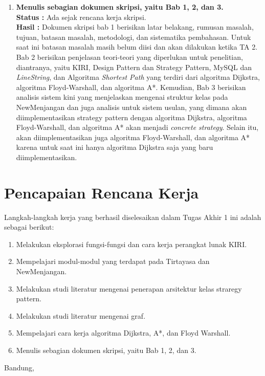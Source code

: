 \documentclass[a4paper,twoside]{article}
\begin{document}
\begin{enumerate}
		\item \textbf{Menulis sebagian dokumen skripsi, yaitu Bab 1, 2, dan 3.} \\
		{\bf Status :} Ada sejak rencana kerja skripsi.\\
		{\bf Hasil :} Dokumen skripsi bab 1 berisikan latar belakang, rumusan masalah, tujuan, batasan masalah, metodologi, dan sistematika pembahasan. Untuk saat ini batasan masalah masih belum diisi dan akan dilakukan ketika TA 2. Bab 2 berisikan penjelasan teori-teori yang diperlukan untuk penelitian, diantranya, yaitu KIRI, Design Pattern dan Strategy Pattern, MySQL dan \textit{LineString}, dan Algoritma \textit{Shortest Path} yang terdiri dari algoritma Dijkstra, algoritma Floyd-Warshall, dan algoritma A*. Kemudian, Bab 3 berisikan analisis sistem kini yang menjelaskan mengenai struktur kelas pada NewMenjangan dan juga analisis untuk sistem usulan, yang dimana akan diimplementasikan strategy pattern dengan algoritma Dijkstra, algoritma Floyd-Warshall, dan algoritma A* akan menjadi \textit{concrete strategy}. Selain itu, akan diimplementasikan juga algoritma Floyd-Warshall, dan algoritma A* karena untuk saat ini hanya algoritma Dijkstra saja yang baru diimplementasikan.
	\end{enumerate}

\section{Pencapaian Rencana Kerja}
Langkah-langkah kerja yang berhasil diselesaikan dalam Tugas Akhir 1 ini adalah sebagai berikut:
\begin{enumerate}
\item Melakukan eksplorasi fungsi-fungsi dan cara kerja perangkat lunak KIRI.
\item Mempelajari modul-modul yang terdapat pada Tirtayasa dan NewMenjangan.
\item Melakukan studi literatur mengenai penerapan arsitektur kelas straregy pattern.
\item Melakukan studi literatur mengenai graf.
\item Mempelajari cara kerja algoritma Dijkstra, A*, dan Floyd Warshall.
\item Menulis sebagian dokumen skripsi, yaitu Bab 1, 2, dan 3.
\end{enumerate}

\vspace{1cm}
\centering Bandung, \tanggal\\
\vspace{2cm} \nama \\ 
\vspace{1cm}
\end{document}
